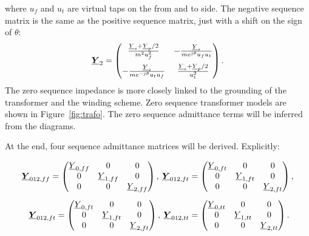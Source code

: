\documentclass[11pt]{article}
\begin{document}
	where $u_{f}$ and $u_{t}$ are virtual taps on the from and to side. The negative sequence matrix is the same as the positive sequence matrix, just with a shift on the sign of $\theta$:
		\begin{equation}
		\underline{\bm{Y}}_2 = \begin{pmatrix}
			\frac{\underline{Y}_s + \underline{Y}_p/2}{m^2u_f^2} & - \frac{\underline{Y}_s}{me^{j\theta}u_{f}u_{t}} \\ \addlinespace
			- \frac{\underline{Y}_s}{me^{-j\theta}u_{t}u_{f}} & \frac{\underline{Y}_s + \underline{Y}_p/2}{u_{t}^2}  \\
		\end{pmatrix}.
	\end{equation}
 	The zero sequence impedance is more closely linked to the grounding of the transformer and the winding scheme. Zero sequence transformer models are shown in Figure~\ref{fig:trafo}. The zero sequence admittance terms will be inferred from the diagrams.

	At the end, four sequence admittance matrices will be derived. Explicitly:

	\begin{equation}
		\begin{split}
		\underline{\bm{Y}}_{012,ff} = 
		\begin{pmatrix}
			\underline{Y}_{0,ff} & 0 & 0 \\
			0 & \underline{Y}_{1,ff} & 0 \\
			0 & 0 & \underline{Y}_{2,ff} \\
		\end{pmatrix}, \:
		\underline{\bm{Y}}_{012,ft} &= 
		\begin{pmatrix}
			\underline{Y}_{0,ft} & 0 & 0 \\
			0 & \underline{Y}_{1,ft} & 0 \\
			0 & 0 & \underline{Y}_{2,ft} \\
		\end{pmatrix}, \\ \addlinespace
		\underline{\bm{Y}}_{012,ft} = 
		\begin{pmatrix}
			\underline{Y}_{0,ft} & 0 & 0 \\
			0 & \underline{Y}_{1,ft} & 0 \\
			0 & 0 & \underline{Y}_{2,ft} \\
		\end{pmatrix}, \:
		\underline{\bm{Y}}_{012,tt} &= 
		\begin{pmatrix}
			\underline{Y}_{0,tt} & 0 & 0 \\
			0 & \underline{Y}_{1,tt} & 0 \\
			0 & 0 & \underline{Y}_{2,tt} \\
		\end{pmatrix}. \\
	\end{split}
	\end{equation}
\end{document}
